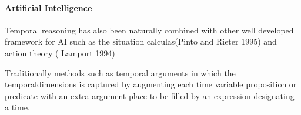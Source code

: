 \documentclass[12pt,letterpaper]{article}
\begin{document}
\begin{enumerate}
\paragraph{Artificial Intelligence}
	Temporal reasoning has also been naturally combined with other well developed framework for AI such as the situation calculas(Pinto and Rieter 1995) and action theory ( Lamport 1994)

Traditionally methods such as temporal arguments in which the temporaldimensions is captured by augmenting each time variable proposition or predicate with an extra argument place to be filled by an expression designating a time.

  \end{enumerate}
\end{document}
